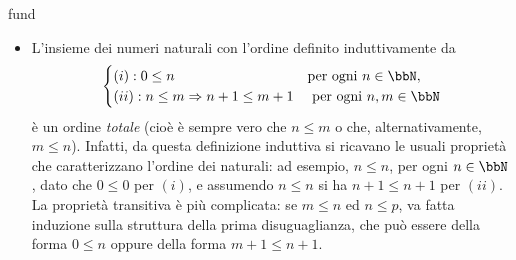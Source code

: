 \begin{hExamples}{fund}\label{alcuni_es_ordini}\leavevmode
 \begin{itemize}
  \item L'insieme dei numeri naturali con l'ordine definito induttivamente da
        \[\begin{cases}
          (i): 0\le n                         & \text{per ogni } n\in\bbN,   \\
          (ii): n\le m \Rightarrow n+1\le m+1 & \text{ per ogni } n,m\in\bbN
         \end{cases}\]
        è un ordine \emph{totale} (cioè è sempre vero che \(n\le m\) o che, alternativamente, \(m\le n\)). Infatti, da questa definizione induttiva si ricavano le usuali proprietà che caratterizzano l'ordine dei naturali: ad esempio, \(n\le n\), per ogni \(n\in\bbN\), dato che \(0\le 0\) per \((i)\), e assumendo \(n\le n\) si ha \(n+1\le n+1\) per \((ii)\). La proprietà transitiva è più complicata: se $m\le n$ ed $n \le p$, va fatta induzione sulla struttura della prima disuguaglianza, che può essere della forma $0\le n$ oppure della forma $m+1 \le n+1$.


\end{itemize}
\end{hExamples}
